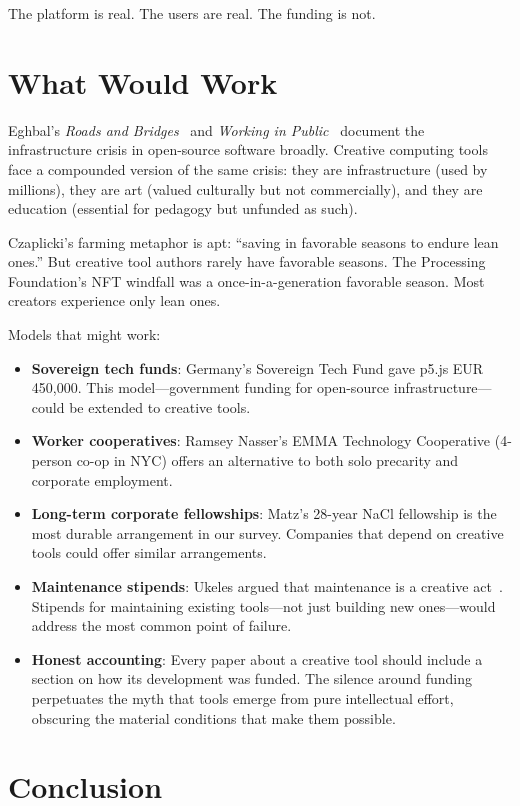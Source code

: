 \documentclass[10pt,letterpaper,twocolumn]{article}
\begin{document}
The platform is real. The users are real. The funding is not.

\section{What Would Work}

Eghbal's \emph{Roads and Bridges}~\citep{eghbal2016roads} and \emph{Working in Public}~\citep{eghbal2020working} document the infrastructure crisis in open-source software broadly. Creative computing tools face a compounded version of the same crisis: they are infrastructure (used by millions), they are art (valued culturally but not commercially), and they are education (essential for pedagogy but unfunded as such).

Czaplicki's farming metaphor is apt: ``saving in favorable seasons to endure lean ones.'' But creative tool authors rarely have favorable seasons. The Processing Foundation's NFT windfall was a once-in-a-generation favorable season. Most creators experience only lean ones.

Models that might work:
\begin{itemize}
  \item \textbf{Sovereign tech funds}: Germany's Sovereign Tech Fund gave p5.js EUR 450,000. This model---government funding for open-source infrastructure---could be extended to creative tools.
  \item \textbf{Worker cooperatives}: Ramsey Nasser's EMMA Technology Cooperative (4-person co-op in NYC) offers an alternative to both solo precarity and corporate employment.
  \item \textbf{Long-term corporate fellowships}: Matz's 28-year NaCl fellowship is the most durable arrangement in our survey. Companies that depend on creative tools could offer similar arrangements.
  \item \textbf{Maintenance stipends}: Ukeles argued that maintenance is a creative act~\citep{ukeles1969manifesto}. Stipends for maintaining existing tools---not just building new ones---would address the most common point of failure.
  \item \textbf{Honest accounting}: Every paper about a creative tool should include a section on how its development was funded. The silence around funding perpetuates the myth that tools emerge from pure intellectual effort, obscuring the material conditions that make them possible.
\end{itemize}

\section{Conclusion}
\end{document}

